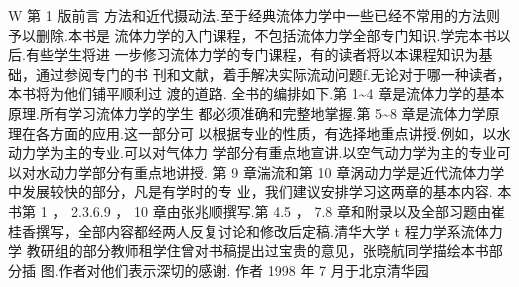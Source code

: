 W 第 1 版前言 方法和近代摄动法.至于经典流体力学中一些已经不常用的方法则予以删除.本书是 流体力学的入门课程，不包括流体力学全部专门知识.学完本书以后.有些学生将进 一步修习流体力学的专门课程，有的读者将以本课程知识为基础，通过参阅专门的书 刊和文献，着手解决实际流动问题f.无论对于哪一种读者，本书将为他们铺平顺利过 渡的道路. 全书的编排如下.第 1\textasciitilde{}4 章是流体力学的基本原理.所有学习流体力学的学生 都必须准确和完整地掌握.第 5\textasciitilde{}8 章是流体力学原理在各方面的应用.这一部分可 以根据专业的性质，有选择地重点讲授.例如，以水动力学为主的专业.可以对气体力 学部分有重点地宣讲.以空气动力学为主的专业可以对水动力学部分有重点地讲授. 第 9 章湍流和第 10 章涡动力学是近代流体力学中发展较快的部分，凡是有学时的专 业，我们建议安排学习这两章的基本内容. 本书第 1 ， 2.3.6.9 ， 10 章由张兆顺撰写.第 4.5 ， 7.8 章和附录以及全部习题由崔 桂香撰写，全部内容都经两人反复讨论和修改后定稿.清华大学 t 程力学系流体力学 教研组的部分教师租学住曾对书稿提出过宝贵的意见，张晓航同学描绘本书部分插 图.作者对他们表示深切的感谢. 作者 1998 年 7 月于北京清华园

